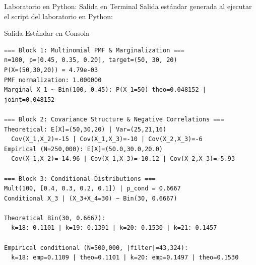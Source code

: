 \documentclass[10pt, aspectratio=169]{beamer}
\begin{document}
\begin{frame}[fragile]{Laboratorio en Python: Salida en Terminal}
  \scriptsize
  Salida estándar generada al ejecutar el script del laboratorio en Python:
  \vspace{0.02cm}
  \begin{block}{Salida Estándar en Consola}
    \fontsize{4pt}{5pt}\selectfont
    \begin{verbatim}
=== Block 1: Multinomial PMF & Marginalization ===
n=100, p=[0.45, 0.35, 0.20], target=(50, 30, 20)
P(X=(50,30,20)) = 4.79e-03
PMF normalization: 1.000000
Marginal X_1 ~ Bin(100, 0.45): P(X_1=50) theo=0.048152 | joint=0.048152

=== Block 2: Covariance Structure & Negative Correlations ===
Theoretical: E[X]=(50,30,20) | Var=(25,21,16)
  Cov(X_1,X_2)=-15 | Cov(X_1,X_3)=-10 | Cov(X_2,X_3)=-6
Empirical (N=250,000): E[X]=(50.0,30.0,20.0)
  Cov(X_1,X_2)=-14.96 | Cov(X_1,X_3)=-10.12 | Cov(X_2,X_3)=-5.93

=== Block 3: Conditional Distributions ===
Mult(100, [0.4, 0.3, 0.2, 0.1]) | p_cond = 0.6667
Conditional X_3 | (X_3+X_4=30) ~ Bin(30, 0.6667)

Theoretical Bin(30, 0.6667):
  k=18: 0.1101 | k=19: 0.1391 | k=20: 0.1530 | k=21: 0.1457

Empirical conditional (N=500,000, |filter|=43,324):
  k=18: emp=0.1109 | theo=0.1101 | k=20: emp=0.1497 | theo=0.1530

    \end{verbatim}
  \end{block}
\end{frame}
\end{document}
